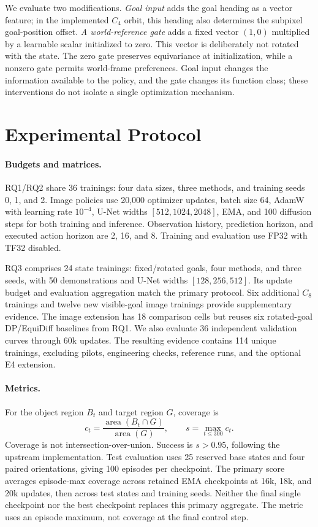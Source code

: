 We evaluate two modifications. \emph{Goal input} adds the goal heading as a
vector feature; in the implemented $C_4$ orbit, this heading also determines
the subpixel goal-position offset. \emph{A world-reference gate} adds a fixed
vector $(1,0)$ multiplied by a learnable scalar initialized to zero. This
vector is deliberately not rotated with the state. The zero gate preserves
equivariance at initialization, while a nonzero gate permits world-frame
preferences. Goal input changes the information available to the policy,
and the gate changes its function class; these interventions do not isolate
a single optimization mechanism.

\section{Experimental Protocol}
\label{eqstudy:sec:protocol}
\paragraph{Budgets and matrices.}
RQ1/RQ2 share 36 trainings: four data sizes, three methods, and training
seeds 0, 1, and 2. Image policies use 20,000 optimizer updates, batch size 64,
AdamW with learning rate $10^{-4}$, U-Net widths $[512,1024,2048]$, EMA,
and 100 diffusion steps for both training and inference. Observation history,
prediction horizon, and executed action horizon are 2, 16, and 8. Training
and evaluation use FP32 with TF32 disabled.

RQ3 comprises 24 state trainings: fixed/rotated goals, four methods, and three
seeds, with 50 demonstrations and U-Net widths $[128,256,512]$. Its update
budget and evaluation aggregation match the primary protocol. Six additional
$C_8$ trainings and twelve new visible-goal image trainings provide
supplementary evidence. The image extension has 18 comparison cells but
reuses six rotated-goal DP/EquiDiff baselines from RQ1. We also evaluate
36 independent validation curves through 60k updates. The resulting evidence
contains 114 unique trainings, excluding pilots, engineering checks, reference
runs, and the optional E4 extension.

\paragraph{Metrics.}
For the object region $B_t$ and target region $G$, coverage is
\begin{equation}
 c_t=\frac{\operatorname{area}(B_t\cap G)}{\operatorname{area}(G)},
 \qquad s=\max_{t\leq300} c_t.
 \label{eqstudy:eq:coverage}
\end{equation}
Coverage is not intersection-over-union. Success is $s>0.95$, following the
upstream implementation. Test evaluation uses 25 reserved base states and
four paired orientations, giving 100 episodes per checkpoint. The primary
score averages episode-max coverage across retained EMA checkpoints at 16k,
18k, and 20k updates, then across test states and training seeds. Neither
the final single checkpoint nor the best checkpoint replaces this primary
aggregate. The metric uses an episode maximum, not coverage at the final
control step.

